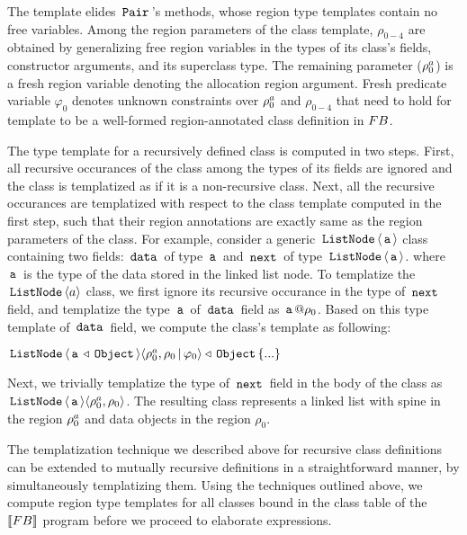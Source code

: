 The template elides $\,{\tt Pair}\,$'s methods, whose region type templates
contain no free variables. Among the region parameters of the class
template, $\rho_{0-4}$ are obtained by generalizing free region
variables in the types of its class's fields, constructor arguments,
and its superclass type.  The remaining parameter ($\rho^a_0$) is a
fresh region variable denoting the allocation region argument. Fresh
predicate variable $\varphi_0$ denotes unknown constraints over
$\rho^a_0$ and $\rho_{0-4}$ that need to hold for template to be a
well-formed region-annotated class definition in ${\sc FB}$. 

The type template for a recursively defined class is computed in two
steps. First, all recursive occurances of the class among the types of
its fields are ignored and the class is templatized as if it is a
non-recursive class. Next, all the recursive occurances are
templatized with respect to the class template computed in the first
step, such that their region annotations are exactly same as the
region parameters of the class. For example, consider a generic
$\,{\tt ListNode}\,\langle \,{\tt a}\, \rangle$ class containing two fields: $\,{\tt data}\,$ of
type $\,{\tt a}\,$ and $\,{\tt next}\,$ of type $\,{\tt ListNode}\,\langle \,{\tt a}\, \rangle$.
where $\,{\tt a}\,$ is the type of the data stored in the linked list node.
To templatize the $\,{\tt ListNode}\,\langle a \rangle$ class, we first ignore its
recursive occurance in the type of $\,{\tt next}\,$ field, and templatize
the type $\,{\tt a}\,$ of $\,{\tt data}\,$ field as $\,{\tt a}\,@\rho_0$. Based on this
type template of $\,{\tt data}\,$ field, we compute the class's template as
following:
\begin{center}
$\,{\tt ListNode}\,\langle \,{\tt a}\,\triangleleft\,{\tt Object}\, \rangle
\langle \rho^a_0,\rho_0\,|\,\varphi_0 \rangle \triangleleft \,{\tt Object}\, \{...\}$
\end{center}
Next, we trivially templatize the type of $\,{\tt next}\,$ field in the body
of the class as $\,{\tt ListNode}\,\langle \,{\tt a}\, \rangle\langle \rho^a_0,\rho_0 \rangle$.
The resulting class represents a linked list with spine in the region
$\rho^a_0$ and data objects in the region $\rho_0$.

The templatization technique we described above for recursive class
definitions can be extended to mutually recursive definitions in a
straightforward manner, by simultaneously templatizing them. Using the
techniques outlined above, we compute region type templates for all
classes bound in the class table of the $\llbracket {\sc FB} \rrbracket$ program before
we proceed to elaborate expressions.

